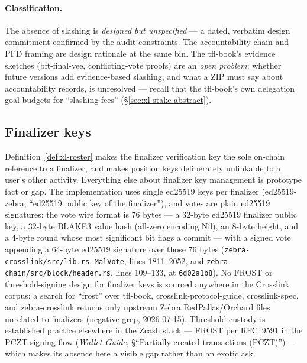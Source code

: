 \documentclass[11pt,a4paper]{article}
\theoremstyle{definition}
\begin{document}
\paragraph{Classification.} The absence of slashing is \emph{designed but
unspecified} --- a dated, verbatim design commitment confirmed by the
audit constraints. The accountability chain and PFD framing are design
rationale at the same bin. The tfl-book's evidence sketches
(bft-final-vee, conflicting-vote proofs) are an \emph{open problem}:
whether future versions add evidence-based slashing, and what a ZIP must
say about accountability records, is unresolved --- recall that the
tfl-book's own delegation goal budgets for ``slashing fees''
(\S\ref{sec:xl-stake-abstract}).

\subsection{Finalizer keys}\label{sec:xl-stake-keys}

Definition~\ref{def:xl-roster} makes the finalizer verification key the
sole on-chain reference to a finalizer, and makes position keys
deliberately unlinkable to a user's other activity. Everything else about
finalizer key management is prototype fact or gap. The implementation
uses single ed25519 keys per finalizer (ed25519-zebra; ``ed25519 public
key of the finalizer''), and votes are plain ed25519 signatures: the vote
wire format is 76 bytes --- a 32-byte ed25519 finalizer public key, a
32-byte BLAKE3 value hash (all-zero encoding Nil), an 8-byte height, and
a 4-byte round whose most significant bit flags a commit --- with a
signed vote appending a 64-byte ed25519 signature over those 76 bytes
(\texttt{zebra-crosslink/src/lib.rs}, \texttt{MalVote}, lines
1811--2052, and \texttt{zebra-chain/src/block/header.rs}, lines
109--133, at \texttt{6d02a1b8}). No FROST
or threshold-signing design for finalizer keys is sourced anywhere in the
Crosslink corpus: a search for ``frost'' over tfl-book,
crosslink-protocol-guide, crosslink-spec, and zebra-crosslink returns
only upstream Zebra RedPallas/Orchard files unrelated to finalizers
(negative grep, 2026-07-15). Threshold custody is established practice
elsewhere in the Zcash stack --- FROST per RFC~9591 in the PCZT signing
flow (\emph{Wallet Guide}, \S``Partially created transactions (PCZT)'')
--- which makes its absence here a visible gap rather than an exotic ask.
\end{document}
